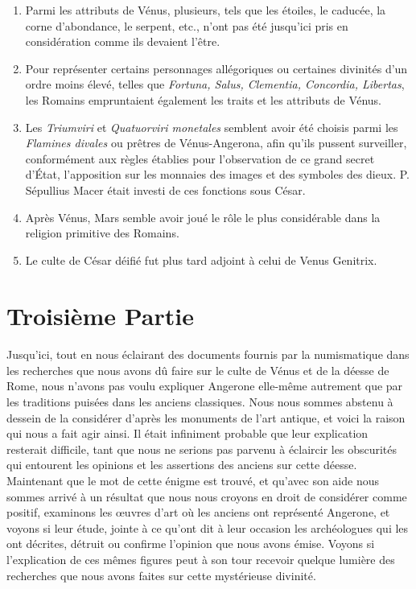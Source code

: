 \documentclass[a4paper, 11pt, oneside, polutonikogreek, french]{article}
\begin{document}
\begin{enumerate}
    \item Parmi les attributs de Vénus, plusieurs, tels que les étoiles, le caducée, la corne d'abondance, le serpent, etc., n'ont pas été jusqu'ici pris en considération comme ils devaient l'être.

    \item Pour représenter certains personnages allégoriques ou certaines divinités d'un ordre moins élevé, telles que \emph{Fortuna, Salus, Clementia, Concordia, Libertas}, les Romains empruntaient également les traits et les attributs de Vénus.

    \item Les \emph{Triumviri} et \emph{Quatuorviri monetales} semblent avoir été choisis parmi les \emph{Flamines divales} ou prêtres de Vénus-Angerona, afin qu'ils pussent surveiller, conformément aux règles établies pour l'observation de ce grand secret d'État, l'apposition sur les monnaies des images et des symboles des dieux. P. Sépullius Macer était investi de ces fonctions sous César.

    \item Après Vénus, Mars semble avoir joué le rôle le plus considérable dans la religion primitive des Romains.

    \item Le culte de César déifié fut plus tard adjoint à celui de Venus Genitrix.
\end{enumerate}
\clearpage
\section{Troisième Partie}
\paragraph{}
Jusqu'ici, tout en nous éclairant des documents fournis par la numismatique dans les recherches que nous avons dû faire sur le culte de Vénus et de la déesse de Rome, nous n'avons pas voulu expliquer Angerone elle-même autrement que par les traditions puisées dans les anciens classiques. Nous nous sommes abstenu à dessein de la considérer d'après les monuments de l'art antique, et voici la raison qui nous a fait agir ainsi. Il était infiniment probable que leur explication resterait difficile, tant que nous ne serions pas parvenu à éclaircir les obscurités qui entourent les opinions et les assertions des anciens sur cette déesse. Maintenant que le mot de cette énigme est trouvé, et qu'avec son aide nous sommes arrivé à un résultat que nous nous croyons en droit de considérer comme positif, examinons les œuvres d'art où les anciens ont représenté Angerone, et voyons si leur étude, jointe à ce qu'ont dit à leur occasion les archéologues qui les ont décrites, détruit ou confirme l'opinion que nous avons émise. Voyons si l'explication de ces mêmes figures peut à son tour recevoir quelque lumière des recherches que nous avons faites sur cette mystérieuse divinité.
\end{document}

